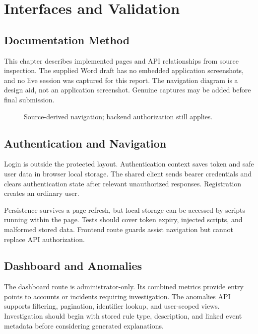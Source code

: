 \chapter{Interfaces and Validation}
\section{Documentation Method}
This chapter describes implemented pages and API relationships from source inspection. The supplied Word draft has no embedded application screenshots, and no live session was captured for this report. The navigation diagram is a design aid, not an application screenshot. Genuine captures may be added before final submission.
\begin{figure}[htbp]\centering{}\caption{Source-derived navigation; backend authorization still applies.}\end{figure}

\section{Authentication and Navigation}
Login is outside the protected layout. Authentication context saves token and safe user data in browser local storage. The shared client sends bearer credentials and clears authentication state after relevant unauthorized responses. Registration creates an ordinary user.

Persistence survives a page refresh, but local storage can be accessed by scripts running within the page. Tests should cover token expiry, injected scripts, and malformed stored data. Frontend route guards assist navigation but cannot replace API authorization.

\section{Dashboard and Anomalies}
The dashboard route is administrator-only. Its combined metrics provide entry points to accounts or incidents requiring investigation. The anomalies API supports filtering, pagination, identifier lookup, and user-scoped views. Investigation should begin with stored rule type, description, and linked event metadata before considering generated explanations.

